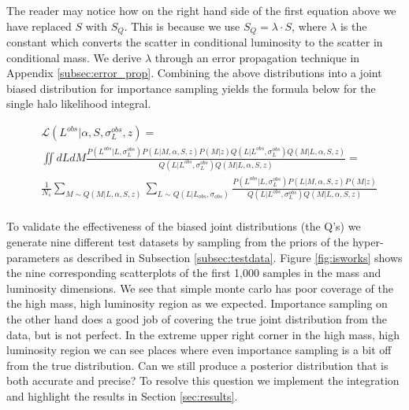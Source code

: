 \documentclass[\docopts]{\docclass}
\begin{document}
The reader may notice how on the right hand side of the first equation above we have replaced $S$ with $S_Q$. 
This is because we use $S_Q = \lambda \cdot S$, where $\lambda$ is the constant which converts the scatter in conditional luminosity to the scatter in conditional mass.
We derive $\lambda$ through an error propagation technique in Appendix \ref{subsec:error_prop}.
Combining the above distributions into a joint biased distribution for importance sampling yields the formula below for the single halo likelihood integral.

{\fontsize{4}{5}\selectfont
\begin{align*}
&\mathcal{L}(L^{obs}|\alpha, S, \sigma_L^{obs}, z) = \\
&\iint dLdM \frac{P(L^{obs}|L, \sigma_L^{obs})P(L|M, \alpha, S, z)P(M|z)Q(L|L^{obs}, \sigma_L^{obs})Q(M|L,\alpha, S, z)}{Q(L|L^{obs}, \sigma_L^{obs})Q(M|L,\alpha, S, z)} =\\
&\frac{1}{N_s}\sum_{M \sim Q(M|L,\alpha, S, z)} \sum_{L \sim Q(L|L_{obs}, \sigma_{obs})}\frac{P(L^{obs}|L, \sigma_L^{obs})P(L|M, \alpha, S, z)P(M|z)}{Q(L|L^{obs}, \sigma_L^{obs})Q(M|L,\alpha, S, z)}\\
\end{align*}
}

To validate the effectiveness of the biased joint distributions (the Q's) we generate nine different test datasets by sampling from the priors of the hyper-parameters as described in Subsection \ref{subsec:testdata}. 
Figure \ref{fig:isworks} shows the nine corresponding scatterplots of the first 1,000 samples in the mass and luminosity dimensions. 
We see that simple monte carlo has poor coverage of the the high mass, high luminosity region as we expected.
Importance sampling on the other hand does a good job of covering the true joint distribution from the data, but is not perfect.
In the extreme upper right corner in the high mass, high luminosity region we can see places where even importance sampling is a bit off from the true distribution. 
Can we still produce a posterior distribution that is both accurate and precise?
To resolve this question we implement the integration and highlight the results in Section \ref{sec:results}.
\end{document}
